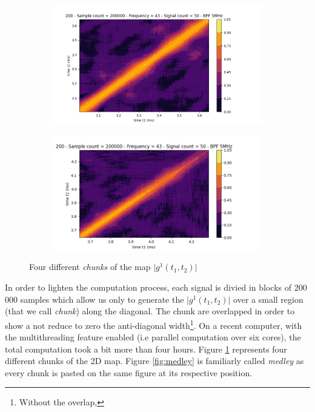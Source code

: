\documentclass[11pt]{report}
\begin{document}
\begin{figure}[h!]
\centering
\begin{subfigure}{.48\textwidth}
  \centering
  \includegraphics[width=1.1\linewidth]{sp-g12-4}
\end{subfigure}%
\hspace{1em}%
\begin{subfigure}{.48\textwidth}
  \centering
  \includegraphics[width=1.1\linewidth]{sp-g12-2}
\end{subfigure}
\caption{Four different \textit{chunks} of the map $\vert g^1(t_1, t_2) \vert$}
\label{fig:sp-g12}
\end{figure}

In order to lighten the computation process, each signal is divied in blocks of 200 000 samples which allow us only to generate the $\vert g^1(t_1, t_2) \vert$ over a small region (that we call \textit{chunk}) along the diagonal. The chunk are overlapped in order to show a not reduce to zero the anti-diagonal width\footnote{Without the overlap, }. On a recent computer, with the multithreading feature enabled (i.e parallel computation over six cores), the total computation took a bit more than four hours. Figure \ref{fig:sp-g12} represents four different chunks of the 2D map. Figure \ref{fig:medley} is familiarly called \textit{medley} as every chunk is pasted on the same figure at its respective position.
\end{document}
